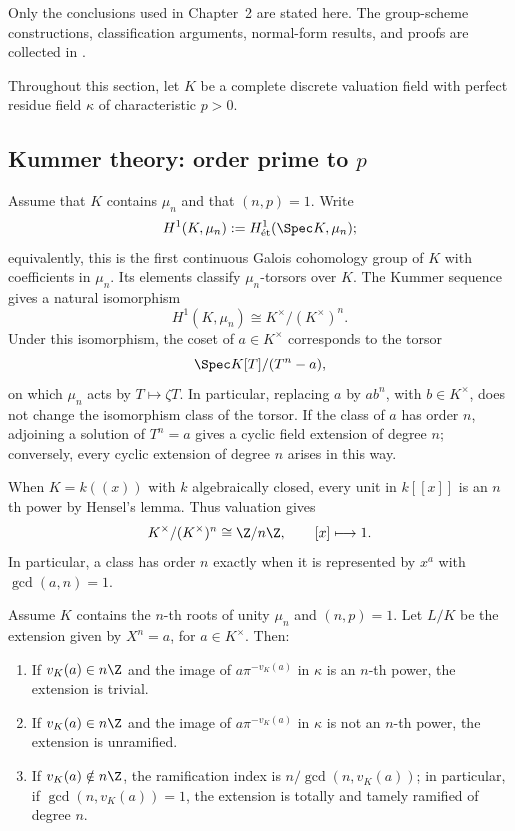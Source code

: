 Only the conclusions used in Chapter~2 are stated here. The group-scheme
constructions, classification arguments, normal-form results, and proofs are
collected in .

Throughout this section, let $K$ be a complete discrete valuation field with
perfect residue field $\kappa$ of characteristic $p>0$.

\subsection{Kummer theory: order prime to \texorpdfstring{$p$}{p}}

Assume that $K$ contains $\mu_n$ and that $(n,p)=1$. Write
\[
H^1(K,\mu_n):=H^1_{\mathrm{\acute et}}(\Spec K,\mu_n);
\]
equivalently, this is the first continuous Galois cohomology group of $K$
with coefficients in $\mu_n$. Its elements classify $\mu_n$-torsors over
$K$. The Kummer sequence gives a natural isomorphism
\[
H^1(K,\mu_n)\cong K^\times/(K^\times)^n.
\]
Under this isomorphism, the coset of $a\in K^\times$ corresponds to the
torsor
\[
\Spec K[T]/(T^n-a),
\]
on which $\mu_n$ acts by $T\mapsto\zeta T$. In particular, replacing $a$
by $ab^n$, with $b\in K^\times$, does not change the isomorphism class of
the torsor. If the class of $a$ has order $n$, adjoining a solution of
$T^n=a$ gives a cyclic field extension of degree $n$; conversely, every
cyclic extension of degree $n$ arises in this way.

When $K=k((x))$ with $k$ algebraically closed, every unit in $k[[x]]$ is an
$n$th power by Hensel's lemma. Thus valuation gives
\begin{equation}\label{eq:kummer_local_normal_form}
K^\times/(K^\times)^n\cong\Z/n\Z,\qquad [x]\longmapsto 1.
\end{equation}
In particular, a class has order $n$ exactly when it is represented by
$x^a$ with $\gcd(a,n)=1$.

\begin{theorem}
\label{theorem:kummer_ramification}
Assume $K$ contains the $n$-th roots of unity $\mu_n$ and $(n,p)=1$.
Let $L/K$ be the extension given by $X^n=a$, for $a\in K^\times$.
Then:
\begin{enumerate}
    \item If $v_K(a)\in n\Z$ and the image of
    $a\pi^{-v_K(a)}$ in $\kappa$ is an $n$-th power, the extension is
    trivial.
    \item If $v_K(a)\in n\Z$ and the image of
    $a\pi^{-v_K(a)}$ in $\kappa$ is not an $n$-th power, the extension is
    unramified.
    \item If $v_K(a)\notin n\Z$, the ramification index is
    $n/\gcd(n,v_K(a))$; in particular, if $\gcd(n,v_K(a))=1$, the extension
    is totally and tamely ramified of degree $n$.
\end{enumerate}
\end{theorem}

